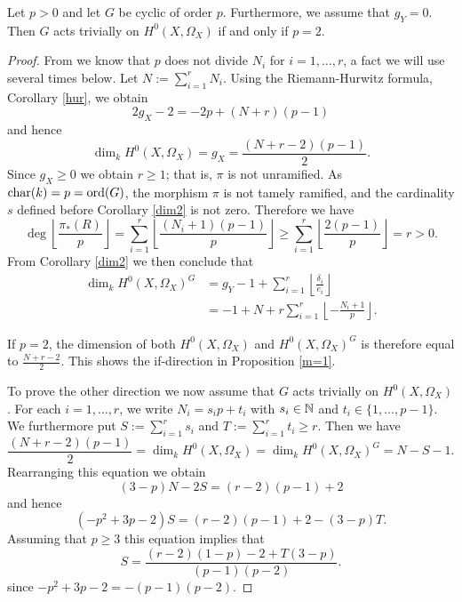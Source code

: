     \begin{prop}\label{m=1}
    Let $p  > 0$ and let $G$ be cyclic of order $p$.
    Furthermore, we assume that $g_Y=0$.
    Then $G$ acts trivially on $H^0(X,\Omega_X)$ if and only if $p=2$. 
    \end{prop}
    \begin{proof}
    From \cite[Lem. 1]{Naka} we know that $p$ does not divide $N_i$ for $i=1,\ldots ,r$, a fact we will use several times below. 
    Let $N:= \sum_{i=1}^r N_i$. 
    Using the Riemann-Hurwitz formula, Corollary \ref{hur}, we obtain
        \begin{equation}\label{hur2}
        2g_X - 2 = -2p + (N+r)(p-1)
        \end{equation}
    and hence
        \[
        \dim_kH^0(X,\Omega_X) = g_X =\frac{(N+r-2)(p-1)}{2}.
        \] 
    Since $g_X \ge 0$ we obtain $r \ge 1$; that is, $\pi$ is not unramified. 
    As $\operatorname{char}(k) = p = \operatorname{ord}(G)$, the morphism $\pi$ is not tamely ramified, and the cardinality $s$ defined before Corollary \ref{dim2} is not zero.
    Therefore we have 
        \[
        \deg \left\lfloor \frac{\pi_*(R)}{p} \right\rfloor =
        \sum_{i=1}^r \left\lfloor \frac{(N_i+1)(p-1)}{p}\right\rfloor 
        \ge \sum_{i=1}^r \left\lfloor \frac{2(p-1)}{p}\right\rfloor = r > 0.
        \] 
    From Corollary \ref{dim2} we then conclude that 
        \begin{align*}
        \dim_kH^0\left(X,\Omega_X\right)^G & =  g_Y - 1 + \sum_{i=1}^r\left\lfloor \frac{\delta_i}{e_i}\right\rfloor \\
        & =  -1 + N + r \sum_{i=1}^r\left\lfloor -\frac{N_i+1}{p}\right\rfloor.
        \end{align*}
    
    If $p=2$, the dimension of both $H^0(X,\Omega_X)$ and $H^0(X,\Omega_X)^G$ is therefore equal to $\frac{N+r-2}{2}$. 
    This shows the if-direction in Proposition \ref{m=1}.
    
    
    
    To prove the other direction we now assume that $G$ acts trivially on $H^0(X, \Omega_X)$.
    For each $i=1, \ldots, r$, we write $N_i = s_i p +t_i$ with $s_i \in {\mathbb N}$ and $t_i \in \{1, \ldots, p-1\}$. 
    We furthermore put $S:=\sum_{i=1}^r s_i$ and $T:= \sum_{i=1}^r t_i \ge r$. 
    Then we have
        \[ 
        \frac{(N+r-2)(p-1)}{2} =\dim_kH^0(X,\Omega_X)  = \dim_k H^0(X,\Omega_X)^G = N-S-1 .
        \]
    Rearranging this equation we obtain
        \[
        (3-p)N - 2S = (r-2)(p-1) +2  
        \]
    and hence
        \[
        (-p^2 + 3p -2)S = (r-2)(p-1) +2 - (3-p)T.
        \]
    Assuming that $p \ge 3$ this equation implies that
        \[ 
        S = \frac{(r-2)(1-p)-2 + T (3-p)}{(p-1)(p-2)}. 
        \]
    since $-p^2+3p-2 = - (p-1)(p-2)$. 
    

\end{proof}
